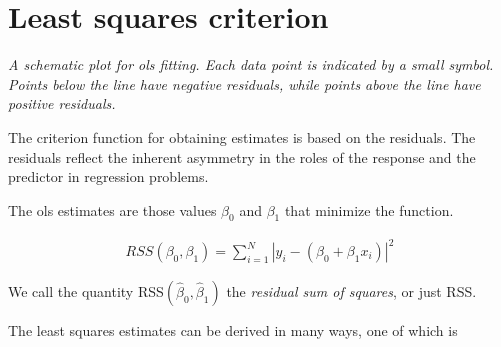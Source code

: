 \documentclass{article}
\begin{document}
\section{Least squares criterion} 
    \begin{center}
        \pgfplotsset{compat=newest}
        
        \textit{A schematic plot for ols fitting. Each data point is indicated by a small symbol. Points below the line have negative residuals, while points above the line have positive residuals.}
    \end{center}
    
    The criterion function for obtaining estimates is based on the residuals. The residuals reflect the inherent asymmetry in the roles of the response and the predictor in regression problems.
    
    The ols estimates are those values ${\beta_{0}}$ and ${\beta_{1}}$ that minimize the function. 
    
    \begin{align}
        RSS(\beta_{0}, \beta_{1}) = \displaystyle \sum _{i = 1} ^ {N}   |y_{i} - (\beta_{0} + \beta_{1} x_{i})| ^ 2
    \end{align}
    
    We call the quantity RSS${ \left (\hat{\beta}_{0},{\hat{\beta}_{1}} \right)}$ the \textit{residual sum of squares}, or just RSS.
    
    The least squares estimates can be derived in many ways, one of which is 
    
\end{document}
